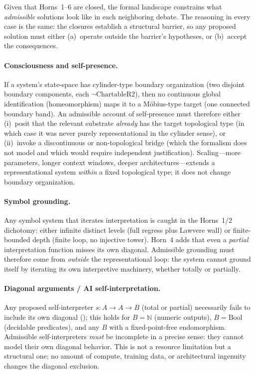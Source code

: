 \documentclass[11pt]{article}
\begin{document}
Given that Horns~1--6 are closed, the formal landscape constrains what
\emph{admissible} solutions look like in each neighboring debate.  The
reasoning in every case is the same: the closures establish a structural
barrier, so any proposed solution must either (a)~operate outside the
barrier's hypotheses, or (b)~accept the consequences.

\paragraph{Consciousness and self-presence.}
If a system's state-space has cylinder-type boundary organization (two
disjoint boundary components, each $\neg\mathrm{ChartableR2}$), then no
continuous global identification (homeomorphism) maps it to a M\"obius-type
target (one connected boundary band).  An admissible account of self-presence
must therefore either
(i)~posit that the relevant substrate \emph{already} has the target topological
type (in which case it was never purely representational in the cylinder
sense), or
(ii)~invoke a discontinuous or non-topological bridge (which the formalism
does not model and which would require independent justification).
Scaling---more parameters, longer context windows, deeper architectures---extends
a representational system \emph{within} a fixed topological type; it does not
change boundary organization.

\paragraph{Symbol grounding.}
Any symbol system that iterates interpretation is caught in the
Horns~1/2 dichotomy: either infinite distinct levels (full regress plus
Lawvere wall) or finite-bounded depth (finite loop, no injective tower).
Horn~4 adds that even a \emph{partial} interpretation function misses its
own diagonal.  Admissible grounding must therefore come from
\emph{outside} the representational loop: the system cannot ground itself
by iterating its own interpretive machinery, whether totally or partially.

\paragraph{Diagonal arguments / AI self-interpretation.}
Any proposed self-interpreter $s : A \to A \to B$ (total or partial)
necessarily fails to include its own diagonal
(); this holds for
$B = \mathbb{N}$ (numeric outputs), $B = \mathrm{Bool}$ (decidable
predicates), and any $B$ with a fixed-point-free endomorphism.
Admissible self-interpreters \emph{must} be incomplete in a precise
sense: they cannot model their own diagonal behavior.  This is not a
resource limitation but a structural one; no amount of compute, training
data, or architectural ingenuity changes the diagonal exclusion.
\end{document}
